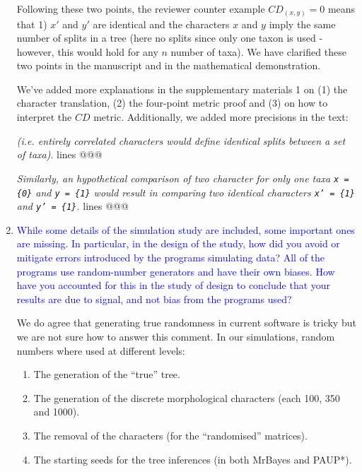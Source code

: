 \documentclass[12pt,letterpaper]{article}
\begin{document}
\begin{enumerate}
Following these two points, the reviewer counter example $CD_{(x,y)} = 0$ means that 1) $x'$ and $y'$ are identical and the characters $x$ and $y$ imply the same number of splits in a tree (here no splits since only one taxon is used - however, this would hold for any $n$ number of taxa).
We have clarified these two points in the manuscript and in the mathematical demonstration.

We've added more explanations in the supplementary materials 1 on (1) the character translation, (2) the four-point metric proof and (3) on how to interpret the $CD$ metric.
Additionally, we added more precisions in the text:

\textit{(i.e. entirely correlated characters would define identical splits between a set of taxa)}. lines @@@

\textit{Similarly, an hypothetical comparison of two character for only one taxa \texttt{x = \{0\}} and \texttt{y = \{1\}} would result in comparing two identical characters \texttt{x' = \{1\}} and \texttt{y' = \{1\}}.} lines @@@


\item{\textcolor{blue}{While some details of the simulation study are included, some important ones are missing. In particular, in the design of the study, how did you avoid or mitigate errors introduced by the programs simulating data? All of the programs use random-number generators and have their own biases. How have you accounted for this in the study of design to conclude that your results are due to signal, and not bias from the programs used?}}


We do agree that generating true randomness in current software is tricky but we are not sure how to answer this comment.
In our simulations, random numbers where used at different levels:

\begin{enumerate}
    \item The generation of the ``true'' tree.
    \item The generation of the discrete morphological characters (each 100, 350 and 1000).
    \item The removal of the characters (for the ``randomised'' matrices).
    \item The starting seeds for the tree inferences (in both MrBayes and PAUP*).
\end{enumerate}


\end{enumerate}
\end{document}
